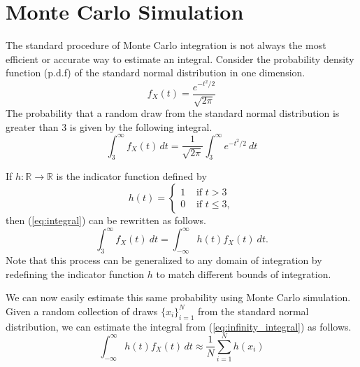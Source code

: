 
\section*{Monte Carlo Simulation} %

The standard procedure of Monte Carlo integration is not always the most efficient or accurate way to estimate an integral.
Consider the probability density function (p.d.f) of the standard normal distribution in one dimension.
\begin{equation}
f_X(t) = \frac{e^{-t^2/2}}{\sqrt{2\pi}}
\label{eq:imsamp-standard-normal}
\end{equation}
The probability that a random draw from the standard normal distribution is greater than $3$ is given by the following integral.
\begin{equation}
\int_{3}^{\infty} f_X(t)\,dt = \frac{1}{\sqrt{2\pi}}\int_{3}^{\infty} e^{-t^2/2}\:dt
\label{eq:integral}
\end{equation}

If $h: \mathbb{R} \rightarrow \mathbb{R}$ is the indicator function defined by
\[
h(t) = \begin{cases}
1 & \text{ if } t > 3 \\
0 & \text{ if } t \leq 3,
\end{cases}
\]
then (\ref{eq:integral}) can be rewritten as follows.
\begin{equation}
\int_{3}^{\infty} f_X(t)\:dt = \int_{-\infty}^{\infty} h(t)f_X(t)\:dt.
\label{eq:infinity_integral}
\end{equation}
Note that this process can be generalized to any domain of integration by redefining the indicator function $h$ to match different bounds of integration.

We can now easily estimate this same probability using Monte Carlo simulation.
Given a random collection of draws $\{x_i\}_{i=1}^N$ from the standard normal distribution, we can estimate the integral from (\ref{eq:infinity_integral}) as follows.
\begin{equation}
\int_{-\infty}^{\infty} h(t)f_X(t)\,dt \approx \frac{1}{N}\sum_{i = 1}^{N}h(x_i)
\label{eq:estimator}
\end{equation}

